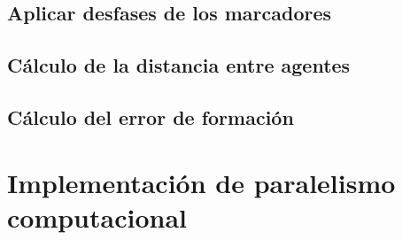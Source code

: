 \subsection{Aplicar desfases de los marcadores}
\subsection{Cálculo de la distancia entre agentes}
\subsection{Cálculo del error de formación}

\section{Implementación de paralelismo computacional}





